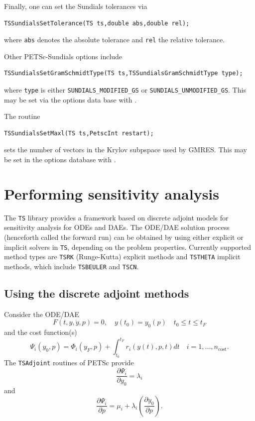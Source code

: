 Finally, one can set the Sundials tolerances via
\begin{lstlisting}
TSSundialsSetTolerance(TS ts,double abs,double rel);
\end{lstlisting}
where \lstinline{abs} denotes the absolute tolerance and \lstinline{rel}
the relative tolerance.

Other PETSc-Sundials options include
\begin{lstlisting}
TSSundialsSetGramSchmidtType(TS ts,TSSundialsGramSchmidtType type);
\end{lstlisting}
where \lstinline{type} is either \lstinline{SUNDIALS_MODIFIED_GS} or
\lstinline{SUNDIALS_UNMODIFIED_GS}.
 This may be set via the options data base
with .

The routine
\begin{lstlisting}
TSSundialsSetMaxl(TS ts,PetscInt restart);
\end{lstlisting}
sets the number of vectors in the Krylov subpspace used by GMRES.
This may be set in the options
database with  . 

\cleardoublepage
\chapter{Performing sensitivity analysis}
\label{chapter_sa}
The \lstinline{TS} library provides a framework based on discrete adjoint models
for sensitivity analysis for ODEs and DAEs.  The ODE/DAE solution
process (henceforth called the forward run) can be obtained by using
either explicit or implicit solvers in \lstinline{TS}, depending on the problem
properties. Currently supported method types are \lstinline{TSRK} (Runge-Kutta) explicit
methods and \lstinline{TSTHETA} implicit methods, which include \lstinline{TSBEULER} and \lstinline{TSCN}.

\section{Using the discrete adjoint methods}

Consider the ODE/DAE
\[
    F(t,y,\dot{y},p) = 0, \quad y(t_0)=y_0(p) \quad t_0 \le t \le t_F
\]
and the cost function(s)
\[
  \Psi_i(y_0,p) = \Phi_i(y_F,p) + \int_{t_0}^{t_F} r_i(y(t),p,t)dt \quad i=1,...,n_\text{cost}.
\]
The \lstinline{TSAdjoint} routines of PETSc provide
\[
 \frac{\partial \Psi_i}{\partial y_0} = \lambda_i
\]
and
\[
 \frac{\partial \Psi_i}{\partial p} = \mu_i + \lambda_i (\frac{\partial y_0}{\partial p}).
\]

